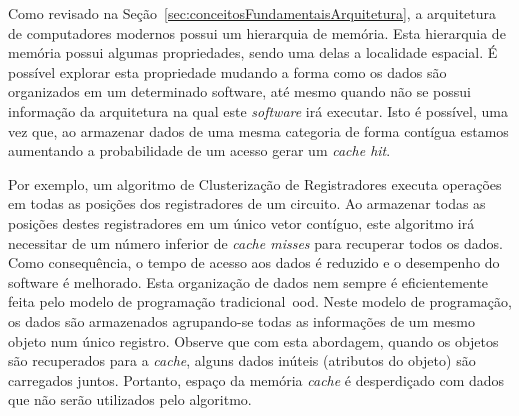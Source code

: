 
Como revisado na Seção~\ref{sec:conceitosFundamentaisArquitetura}, a arquitetura de computadores modernos possui um hierarquia de memória.
Esta hierarquia de memória possui algumas propriedades, sendo uma delas a localidade espacial.
É possível explorar esta propriedade mudando a forma como os dados são organizados em um determinado software, até mesmo quando não se possui informação da arquitetura na qual este \textit{software} irá executar.
Isto é possível, uma vez que, ao armazenar dados de uma mesma categoria de forma contígua estamos aumentando a probabilidade de um acesso gerar um \textit{cache hit}.

Por exemplo, um algoritmo de Clusterização de Registradores executa operações em todas as posições dos registradores de um circuito.
Ao armazenar todas as posições destes registradores em um único vetor contíguo, este algoritmo irá necessitar de um número inferior de \textit{cache misses} para recuperar todos os dados.
Como consequência, o tempo de acesso aos dados é reduzido e o desempenho do software é melhorado. Esta organização de dados nem sempre é eficientemente feita pelo modelo de programação tradicional~\ac{ood}.
Neste modelo de programação, os dados são armazenados agrupando-se todas as informações de um mesmo objeto num único registro.
Observe que com esta abordagem, quando os objetos são recuperados para a \textit{cache}, alguns dados inúteis (atributos do objeto) são carregados juntos.
Portanto, espaço da memória \textit{cache} é desperdiçado com dados que não serão utilizados pelo algoritmo.

